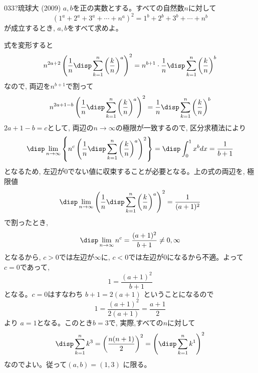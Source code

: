 \begin{prob}{033}{\hosi ?}{琉球大 (2009)}
 $a,b$を正の実数とする。すべての自然数$n$に対して
\[(1^a+2^a+3^a+\cdots +n^a)^2=1^b+2^b+3^b+\cdots +n^b\]
が成立するとき, $a,b$をすべて求めよ。
\end{prob}

式を変形すると
\[n^{2a+2}\left(\dfrac{1}{n}\disp\sum_{k=1}^{n}\left(\dfrac{k}{n}\right)^a\right)^2=n^{b+1}\cdot\dfrac{1}{n}\disp\sum_{k=1}^n\left(\dfrac{k}{n}\right)^b\]
なので, 両辺を$n^{b+1}$で割って
\[ n^{2a+1-b}\left(\dfrac{1}{n}\disp\sum_{k=1}^{n}\left(\dfrac{k}{n}\right)^a\right)^2=\dfrac{1}{n}\disp\sum_{k=1}^n\left(\dfrac{k}{n}\right)^b\]
$2a+1-b=c$として, 両辺の$n\to \infty$の極限が一致するので, 区分求積法により
\[\disp\lim_{n\to \infty} \left\{n^c\left(\dfrac{1}{n}\disp\sum_{k=1}^{n}\left(\dfrac{k}{n}\right)^a\right)^2\right\}=\disp\int_0^1 x^b dx = \dfrac{1}{b+1}\]
となるため, 左辺が0でない値に収束することが必要となる。上の式の両辺を, 極限値
\[\disp\lim_{n\to \infty} \left(\dfrac{1}{n}\disp\sum_{k=1}^n\left(\dfrac{k}{n}\right)^a\right)^{2} = \dfrac{1}{(a+1)^2}\]
で割ったとき,
\[\disp\lim_{n\to \infty} n^c = \dfrac{(a+1)^2}{b+1}\neq 0, \infty\]
となるから, $c>0$では左辺が$\infty$に, $c<0$では左辺が$0$になるから不適。よって$c=0$であって,
\[1=\dfrac{(a+1)^2}{b+1}\]
となる。$c=0$はすなわち $b+1=2(a+1)$ ということになるので
\[1=\dfrac{(a+1)^2}{2(a+1)}=\dfrac{a+1}{2}\]
より $a=1$となる。このとき$b=3$で, 実際,すべての$n$に対して
\[\disp\sum_{k=1}^n k^3=\left(\dfrac{n(n+1)}{2}\right)^2=\left(\disp\sum_{k=1}^n k^1\right)^2\]
なのでよい。従って$(a,b)=(1,3)$ に限る。
